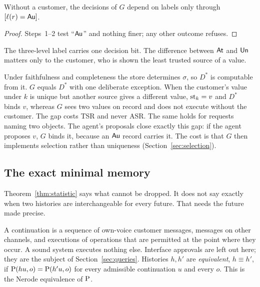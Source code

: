 \begin{proposition}\label{prop:onebit}
Without a customer, the decisions of $G$ depend on labels only through $[\ell(r) = \mathsf{Au}]$.
\end{proposition}
\begin{proof}
Steps~1--2 test ``$\mathsf{Au}$'' and nothing finer; any other outcome refuses.
\end{proof}

The three-level label carries one decision bit. The difference between $\mathsf{At}$ and $\mathsf{Un}$ matters
only to the customer, who is shown the least trusted source of a value.

\begin{remark}
Under faithfulness and completeness the store determines $\sigma$, so $D^*$ is computable from it.
$G$ equals $D^*$ with one deliberate exception. When the customer's value under $k$ is unique but
another source gives a different value, $\mathrm{st}_k = v$ and $D^*$ binds $v$, whereas $G$ sees two
values on record and does not execute without the customer. The gap costs TSR and never ASR.
The same holds for requests naming two objects. The agent's proposals close exactly this gap: if the
agent proposes $v$, $G$ binds it, because an $\mathsf{Au}$ record carries it. The cost is that $G$ then
implements selection rather than uniqueness (Section~\ref{sec:selection}).
\end{remark}

\subsection*{The exact minimal memory}

Theorem~\ref{thm:statistic} says what cannot be dropped. It does not say exactly when two
histories are interchangeable for every future. That needs the future made precise.

\begin{definition}
A continuation is a sequence of own-voice customer messages, messages on other channels, and
executions of operations that are permitted at the point where they occur. A sound system
executes nothing else. Interface approvals are left out here; they are the subject of
Section~\ref{sec:queries}. Histories $h, h'$ are \emph{equivalent}, $h \equiv h'$, if
$\mathrm{P}(hu, o) = \mathrm{P}(h'u, o)$ for every admissible continuation $u$ and every $o$. This is the
Nerode equivalence of $\mathrm{P}$.
\end{definition}

